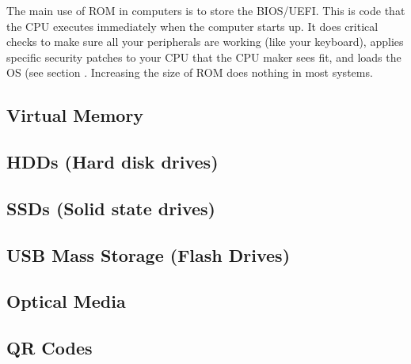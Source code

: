 \documentclass[../main.tex]{subfiles}
\begin{document}
The main use of ROM in computers is to store the BIOS/UEFI. This is code that the CPU executes immediately when the computer starts up. It does critical checks to make sure all your peripherals are working (like your keyboard), applies specific security patches to your CPU that the CPU maker sees fit, and loads the OS (see section \label{4:sec:the_os_and_kernel}. Increasing the size of ROM does nothing in most systems.

\subsection{Virtual Memory}

\subsection{HDDs (Hard disk drives)}

\subsection{SSDs (Solid state drives)}

\subsection{USB Mass Storage (Flash Drives)}

\subsection{Optical Media}

\subsection{QR Codes}
\end{document}
